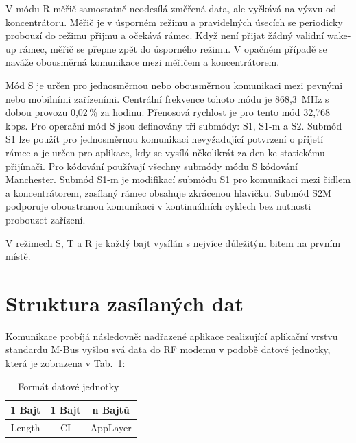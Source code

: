 V	módu R měřič samostatně neodesílá změřená data, ale vyčkává na výzvu od koncentrátoru. Měřič je v úsporném režimu a pravidelných úsecích se periodicky probouzí do režimu přijmu a očekává rámec. Když není přijat žádný validní wake-up rámec, měřič se přepne zpět do úsporného režimu. V	opačném případě se naváže obousměrná komunikace mezi měřičem a koncentrátorem.


Mód S je určen pro jednosměrnou nebo obousměrnou komunikaci mezi pevnými nebo mobilními zařízeními. Centrální frekvence tohoto módu je 868,3\, MHz s dobou provozu 0,02\,\% za hodinu. Přenosová rychlost je pro tento mód 32,768\,kbps. Pro operační mód S jsou definovány tři submódy: S1, S1-m a S2. Submód S1 lze použít pro jednosměrnou komunikaci nevyžadující potvrzení o přijetí rámce a je určen pro aplikace, kdy se vysílá několikrát za den ke statickému přijímači. Pro kódování používají všechny submódy módu S kódování Manchester.  
Submód S1-m je modifikací submódu S1 pro komunikaci mezi čidlem a koncentrátorem, zasílaný rámec obsahuje zkrácenou hlavičku.
Submód S2M podporuje oboustranou komunikaci v kontinuálních cyklech bez nutnosti probouzet zařízení.

V režimech S, T a R je každý bajt vysílán s nejvíce důležitým bitem na prvním místě.



\section{Struktura zasílaných dat}
Komunikace probíjá následovně: nadřazené aplikace realizující aplikační vrstvu standardu M-Bus vyšlou svá data do RF modemu v podobě datové jednotky, která je zobrazena v Tab.~\ref{PaketWm1}:

\begin{table}[!ht]
\vspace{-10pt}
\centering
\begin{tabular}{ccc}
1 Bajt & 1 Bajt & n Bajtů \\ \hline
\multicolumn{1}{|c|}{Length} & \multicolumn{1}{c|}{CI} & \multicolumn{1}{c|}{AppLayer} \\ \hline
\end{tabular}
\caption{Formát datové jednotky~\cite{FormatDatoveJednotky}}
\label{PaketWm1}
\vspace{-10pt}
\end{table}

